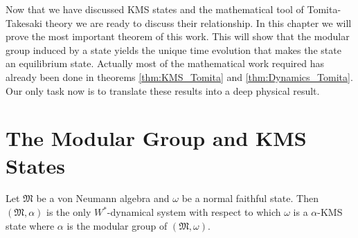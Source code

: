 Now that we have discussed KMS states and the mathematical tool of Tomita-Takesaki theory we are ready to discuss their relationship. In this chapter we will prove the most important theorem of this work. This will show that the modular group induced by a state yields the unique time evolution that makes the state an equilibrium state. Actually most of the mathematical work required has already been done in theorems \ref{thm:KMS_Tomita} and \ref{thm:Dynamics_Tomita}. Our only task now is to translate these results into a deep physical result. 

\section{The Modular Group and KMS States}

\begin{theorem}
Let $\mathfrak{M}$ be a von Neumann algebra and $\omega$ be a normal faithful state. Then $(\mathfrak{M},\alpha)$ is the only $W^*$-dynamical system with respect to which $\omega$ is a $\alpha$-KMS state where $\alpha$  is the modular group of $(\mathfrak{M},\omega)$.
\end{theorem} 

